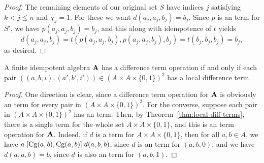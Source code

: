 \begin{proof}
The remaining elements of our original set $S$
have indices $j$ satisfying $k<j\leq n$ and $\chi_j = 1$.
For these we want $d(a_j,a_j,b_j) = b_j$.
Since $p$ is an \ld term for $S'$, we have
$p(a_j,a_j,b_j) = b_j$, and this along with idempotence of $t$ yields
\[ d(a_j,a_j,b_j) =  t(p(a_j,a_j,b_j), p(a_j,a_j,b_j), b_j)=  t(b_j, b_j, b_j) =b_j,\]
as desired.
\end{proof}

\begin{corollary}
  \label{cor:loc-diff-term}
  A finite idempotent algebra $\mathbf{A}$ has a difference term operation if and
  only if each pair $((a,b,i), (a',b',i')) \in (A\times A \times \{0,1\})^2$ has a local
  difference term.
\end{corollary}
\begin{proof}
  One direction is clear, since a difference term operation for $\mathbf{A}$ is
  obviously an \ld term for every pair in 
  $(A\times A \times \{0,1\})^2$.
  For the converse, suppose
  each pair in $(A\times A \times \{0,1\})^2$ has an \ld term. 
  Then, by Theorem~\ref{thm:local-diff-terms},
  there is a single \ld term for the whole set $A\times A \times \{0,1\}$,
  and this is an \ld term operation for $\mathbf{A}$.  Indeed, if $d$ is a
  \ld term for $A\times A \times \{0,1\}$, then
  for all $a, b \in A$, we have
  $a \mathrel{[\operatorname{Cg}(a,b), \operatorname{Cg}(a,b)]} d(a,b,b)$,
  since $d$ is an \ld term for $(a,b,0)$, and we have
  $d(a,a,b) = b$, since $d$ is also an \ld term for
  $(a,b,1)$.
\end{proof}


